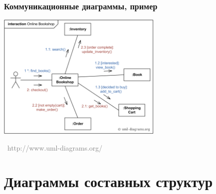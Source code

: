 \documentclass[xetex,mathserif,serif]{beamer}
\newcommand{\attribution}[1] {
    \vspace{-5mm}\begin{flushright}\begin{scriptsize}\textcolor{gray}{\textcopyright\, #1}\end{scriptsize}\end{flushright}
}
\begin{document}
    \begin{frame}
        \frametitle{Коммуникационные диаграммы, пример}
        \begin{center}
            \includegraphics[width=0.6\textwidth]{communicationDiagramExample.png}
            \attribution{http://www.uml-diagrams.org/}
        \end{center}
    \end{frame}

    \section{Диаграммы составных структур}
\end{document}
